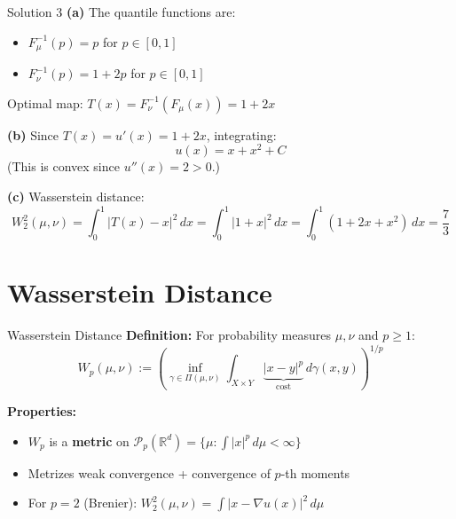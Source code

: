 \documentclass[aspectratio=169]{beamer}
\newcommand{\R}{\mathbb{R}}
\newcommand{\Pp}{\mathcal{P}_p}
\begin{document}
\begin{frame}{Solution 3}
\textbf{(a)} The quantile functions are:
\begin{itemize}
    \item $F_\mu^{-1}(p) = p$ for $p \in [0,1]$
    \item $F_\nu^{-1}(p) = 1 + 2p$ for $p \in [0,1]$
\end{itemize}
Optimal map: $T(x) = F_\nu^{-1}(F_\mu(x)) = 1 + 2x$

\vspace{0.3cm}
\textbf{(b)} Since $T(x) = u'(x) = 1 + 2x$, integrating:
\[
u(x) = x + x^2 + C
\]
(This is convex since $u''(x) = 2 > 0$.)

\vspace{0.3cm}
\textbf{(c)} Wasserstein distance:
\[
W_2^2(\mu,\nu) = \int_0^1 |T(x) - x|^2\,dx = \int_0^1 |1+x|^2\,dx = \int_0^1 (1+2x+x^2)\,dx = \frac{7}{3}
\]
\end{frame}

\section{Wasserstein Distance}

\begin{frame}{Wasserstein Distance}
\textbf{Definition:} For probability measures $\mu, \nu$ and $p \geq 1$:
\[
W_p(\mu, \nu) := \left( \inf_{\gamma \in \Pi(\mu,\nu)} \int_{X \times Y} \underbrace{|x-y|^p}_{\text{cost}} \, d\gamma(x,y) \right)^{1/p}
\]

\vspace{0.3cm}
\textbf{Properties:}
\begin{itemize}
    \item $W_p$ is a \textbf{metric} on $\Pp(\R^d) = \{\mu : \int |x|^p \, d\mu < \infty\}$
    \item Metrizes weak convergence + convergence of $p$-th moments
    \item For $p=2$ (Brenier): $W_2^2(\mu,\nu) = \int |x - \nabla u(x)|^2 \, d\mu$
\end{itemize}

\vspace{0.3cm}
\begin{center}
\end{center}
\end{frame}
\end{document}
